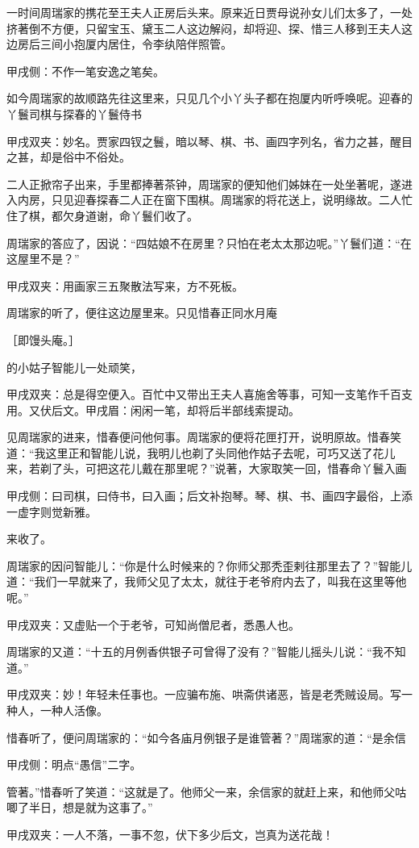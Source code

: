 \begin{parag}
    一时间周瑞家的携花至王夫人正房后头来。原来近日贾母说孙女儿们太多了，一处挤著倒不方便，只留宝玉、黛玉二人这边解闷，却将迎、探、惜三人移到王夫人这边房后三间小抱厦内居住，令李纨陪伴照管。\begin{note}甲戌侧：不作一笔安逸之笔矣。\end{note}如今周瑞家的故顺路先往这里来，只见几个小丫头子都在抱厦内听呼唤呢。迎春的丫鬟司棋与探春的丫鬟侍书\begin{note}甲戌双夹：妙名。贾家四钗之鬟，暗以琴、棋、书、画四字列名，省力之甚，醒目之甚，却是俗中不俗处。\end{note}二人正掀帘子出来，手里都捧著茶钟，周瑞家的便知他们姊妹在一处坐著呢，遂进入内房，只见迎春探春二人正在窗下围棋。周瑞家的将花送上，说明缘故。二人忙住了棋，都欠身道谢，命丫鬟们收了。
\end{parag}


\begin{parag}
    周瑞家的答应了，因说：“四姑娘不在房里？只怕在老太太那边呢。”丫鬟们道：“在这屋里不是？”\begin{note}甲戌双夹：用画家三五聚散法写来，方不死板。\end{note}周瑞家的听了，便往这边屋里来。只见惜春正同水月庵\begin{note}［即馒头庵。］\end{note}的小姑子智能儿一处顽笑，\begin{note}甲戌双夹：总是得空便入。百忙中又带出王夫人喜施舍等事，可知一支笔作千百支用。又伏后文。甲戌眉：闲闲一笔，却将后半部线索提动。\end{note}见周瑞家的进来，惜春便问他何事。周瑞家的便将花匣打开，说明原故。惜春笑道：“我这里正和智能儿说，我明儿也剃了头同他作姑子去呢，可巧又送了花儿来，若剃了头，可把这花儿戴在那里呢？”说著，大家取笑一回，惜春命丫鬟入画\begin{note}甲戌侧：曰司棋，曰侍书，曰入画；后文补抱琴。琴、棋、书、画四字最俗，上添一虚字则觉新雅。\end{note}来收了。
\end{parag}


\begin{parag}
    周瑞家的因问智能儿：“你是什么时候来的？你师父那秃歪剌往那里去了？”智能儿道：“我们一早就来了，我师父见了太太，就往于老爷府内去了，叫我在这里等他呢。”\begin{note}甲戌双夹：又虚贴一个于老爷，可知尚僧尼者，悉愚人也。\end{note}周瑞家的又道：“十五的月例香供银子可曾得了没有？”智能儿摇头儿说：“我不知道。”\begin{note}甲戌双夹：妙！年轻未任事也。一应骗布施、哄斋供诸恶，皆是老秃贼设局。写一种人，一种人活像。\end{note}惜春听了，便问周瑞家的：“如今各庙月例银子是谁管著？”周瑞家的道：“是余信\begin{note}甲戌侧：明点“愚信”二字。\end{note}管著。”惜春听了笑道：“这就是了。他师父一来，余信家的就赶上来，和他师父咕唧了半日，想是就为这事了。”\begin{note}甲戌双夹：一人不落，一事不忽，伏下多少后文，岂真为送花哉！\end{note}
\end{parag}


